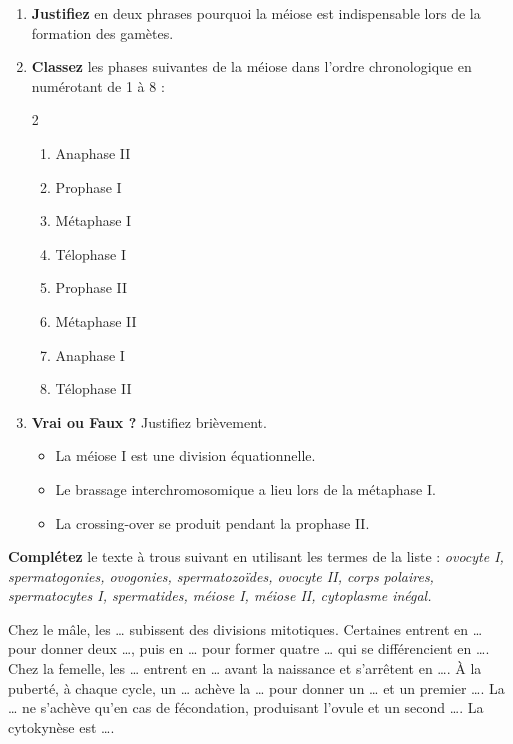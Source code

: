 \documentclass[11pt]{article}
\begin{document}
\begin{exercice}
\begin{enumerate}
\item \textbf{Justifiez} en deux phrases pourquoi la méiose est indispensable lors de la formation des gamètes.
\item \textbf{Classez} les phases suivantes de la méiose dans l'ordre chronologique en numérotant de 1 à 8 :
\begin{multicols}{2}
\begin{enumerate}
\item Anaphase II \item Prophase I \item Métaphase I \item Télophase I
\item Prophase II \item Métaphase II \item Anaphase I \item Télophase II
\end{enumerate}
\end{multicols}
\item \textbf{Vrai ou Faux ?} Justifiez brièvement.
\begin{itemize}
\item La méiose I est une division équationnelle.
\item Le brassage interchromosomique a lieu lors de la métaphase I.
\item La crossing-over se produit pendant la prophase II.
\end{itemize}
\end{enumerate}
\end{exercice}

\begin{exercice}
\textbf{Complétez} le texte à trous suivant en utilisant les termes de la liste :
\emph{ovocyte I, spermatogonies, ovogonies, spermatozoïdes, ovocyte II, corps polaires, spermatocytes I, spermatides, méiose I, méiose II, cytoplasme inégal.}

Chez le mâle, les \ldots{} subissent des divisions mitotiques. Certaines entrent en \ldots{} pour donner deux \ldots{}, puis en \ldots{} pour former quatre \ldots{} qui se différencient en \ldots{}.
Chez la femelle, les \ldots{} entrent en \ldots{} avant la naissance et s'arrêtent en \ldots{}. À la puberté, à chaque cycle, un \ldots{} achève la \ldots{} pour donner un \ldots{} et un premier \ldots{}. La \ldots{} ne s'achève qu'en cas de fécondation, produisant l'ovule et un second \ldots{}. La cytokynèse est \ldots{}.
\end{exercice}
\end{document}
